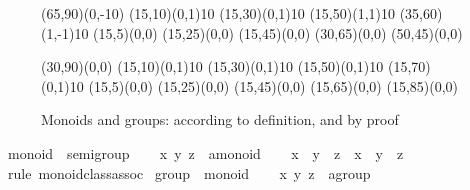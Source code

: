 \begin{isabellebody}
\begin{isamarkuptext}
 \begin{figure}[htbp]
   \begin{center}
     \small
     \unitlength 0.6mm
     \begin{picture}(65,90)(0,-10)
       \put(15,10){\line(0,1){10}} \put(15,30){\line(0,1){10}}
       \put(15,50){\line(1,1){10}} \put(35,60){\line(1,-1){10}}
       \put(15,5){\makebox(0,0){}}
       \put(15,25){\makebox(0,0){}}
       \put(15,45){\makebox(0,0){}}
       \put(30,65){\makebox(0,0){}} \put(50,45){\makebox(0,0){}}
     \end{picture}
     \hspace{4em}
     \begin{picture}(30,90)(0,0)
       \put(15,10){\line(0,1){10}} \put(15,30){\line(0,1){10}}
       \put(15,50){\line(0,1){10}} \put(15,70){\line(0,1){10}}
       \put(15,5){\makebox(0,0){}}
       \put(15,25){\makebox(0,0){}}
       \put(15,45){\makebox(0,0){}}
       \put(15,65){\makebox(0,0){}}
       \put(15,85){\makebox(0,0){}}
     \end{picture}
     \caption{Monoids and groups: according to definition, and by proof}
     \label{fig:monoid-group}
   \end{center}
 \end{figure}%
\end{isamarkuptext}%
\isamarkuptrue%
\isamarkupfalse%
\ monoid\ {\isasymsubseteq}\ semigroup\isanewline
%
\isadelimproof
%
\endisadelimproof
%
\isatagproof
{}\isamarkupfalse%
\isanewline
\ \ \isamarkupfalse%
\ x\ y\ z\ {\isacharcolon}{\isacharcolon}\ {\isachardoublequoteopen}{\isacharprime}a{\isasymColon}monoid{\isachardoublequoteclose}\isanewline
\ \ \isamarkupfalse%
\ {\isachardoublequoteopen}x\ {\isasymodot}\ y\ {\isasymodot}\ z\ {\isacharequal}\ x\ {\isasymodot}\ {\isacharparenleft}y\ {\isasymodot}\ z{\isacharparenright}{\isachardoublequoteclose}\isanewline
\ \ \ \ \isamarkupfalse%
\ {\isacharparenleft}rule\ monoid{\isacharunderscore}class{\isachardot}assoc{\isacharparenright}\isanewline
{}\isamarkupfalse%
%
\endisatagproof
{\isafoldproof}%
%
\isadelimproof
\isanewline
%
\endisadelimproof
\isanewline
{}\isamarkupfalse%
\ group\ {\isasymsubseteq}\ monoid\isanewline
%
\isadelimproof
%
\endisadelimproof
%
\isatagproof
{}\isamarkupfalse%
\isanewline
\ \ \isamarkupfalse%
\ x\ y\ z\ {\isacharcolon}{\isacharcolon}\ {\isachardoublequoteopen}{\isacharprime}a{\isasymColon}group{\isachardoublequoteclose}\isanewline

\end{isabellebody}
